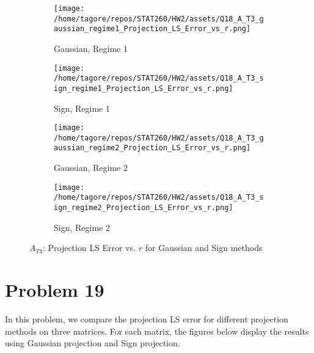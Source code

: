 \documentclass{article}
\begin{document}
\begin{figure}[H]
    \centering
    \begin{subfigure}[b]{0.48\textwidth}
        \centering
        \texttt{[image: /home/tagore/repos/STAT260/HW2/assets/Q18\_A\_T3\_gaussian\_regime1\_Projection\_LS\_Error\_vs\_r.png]}
        \caption{Gaussian, Regime 1}
        \label{fig:T3_gaussian_regime1}
    \end{subfigure}
    \hfill
    \begin{subfigure}[b]{0.48\textwidth}
        \centering
        \texttt{[image: /home/tagore/repos/STAT260/HW2/assets/Q18\_A\_T3\_sign\_regime1\_Projection\_LS\_Error\_vs\_r.png]}
        \caption{Sign, Regime 1}
        \label{fig:T3_sign_regime1}
    \end{subfigure}
    
    \vspace{0.5cm}
    
    \begin{subfigure}[b]{0.48\textwidth}
        \centering
        \texttt{[image: /home/tagore/repos/STAT260/HW2/assets/Q18\_A\_T3\_gaussian\_regime2\_Projection\_LS\_Error\_vs\_r.png]}
        \caption{Gaussian, Regime 2}
        \label{fig:T3_gaussian_regime2}
    \end{subfigure}
    \hfill
    \begin{subfigure}[b]{0.48\textwidth}
        \centering
        \texttt{[image: /home/tagore/repos/STAT260/HW2/assets/Q18\_A\_T3\_sign\_regime2\_Projection\_LS\_Error\_vs\_r.png]}
        \caption{Sign, Regime 2}
        \label{fig:T3_sign_regime2}
    \end{subfigure}
    
    \caption{\(A_{T3}\): Projection LS Error vs. \(r\) for Gaussian and Sign methods}
    \label{fig:T3_projection_comparison}
\end{figure}
\section*{Problem 19}
In this problem, we compare the projection LS error for different projection methods on three matrices. For each matrix, the figures below display the results using Gaussian projection and Sign projection.
\end{document}
